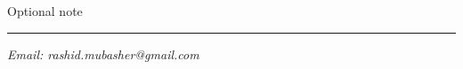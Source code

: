 
\setcounter{page}{0}
\thispagestyle{fancy-blank}
\begingroup
{\large Optional note\par}

\vspace*{30mm}
{\huge\bfseries\utitle\par}

\vspace*{5mm}
{\Large\usubtitle\par}

\vspace*{4mm}
{\rule{\linewidth}{0.5mm}\par}
\vspace*{4mm}

{\large\bfseries\uauthor\par}\vspace*{1mm}

{\large\itshape\uaffiliation\newline}
{\large\itshape\udate\newline}
{\large\itshape{Email: rashid.mubasher@gmail.com}\par}

\vfill
\endgroup
\clearpage

